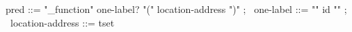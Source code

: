 \begin{syntax}
  pred ::=  "\valid_function" one-label? "(" location-address ")" ;
       \
  one-label ::= "{" id "}" ;
       \
  location-address ::= tset
\end{syntax}
